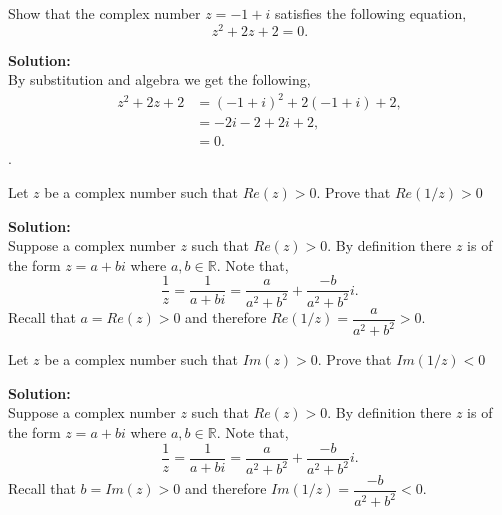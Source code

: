\documentclass[12pt]{article}
\makeatletter
\theoremstyle{homework}
\newenvironment{exercise}[1]
{\def\@currentlabel{#1}\exercisecore}
{\endexercisecore}
\newcommand{\localhead}[1]{\par\smallskip\noindent\textbf{#1}\nobreak\\}%
\newcommand\solution{\localhead{Solution:}}
\newcommand{\Reals}{\ensuremath{\mathbb R}}
\let\RR\Reals
\makeatother
\begin{document}
\begin{exercise}{18} Show that the complex number $z = -1 + i$ satisfies the following equation, 
    \begin{equation*}
        z^2 + 2z + 2 = 0.
    \end{equation*}
    \solution By substitution and algebra we get the following, 
    \begin{align*}
        z^2 + 2z + 2 &= (-1 + i)^2 + 2(-1 + i) + 2,\\
        &= -2i -2 + 2i + 2,\\
        &= 0.
    \end{align*}. 
\end{exercise}
\vspace{1in}



\begin{exercise}{23} Let $z$ be a complex number such that $Re(z) > 0$. Prove that $Re(1/z) > 0$\\
    \solution Suppose a complex number $z$ such that $Re(z) > 0$. By definition there $z$ is of the form 
    $z = a + bi$ where $a,b \in \RR$. Note that, 
    \begin{equation*}
        \dfrac{1}{z} = \dfrac{1}{a + bi} = \dfrac{a}{a^2 + b^2} + \dfrac{-b}{a^2 + b^2}i.
    \end{equation*}
    Recall that $a = Re(z) > 0 $ and therefore $Re(1/z) = \dfrac{a}{a^2 + b^2} > 0$. 
\end{exercise}
\vspace{1in}

\begin{exercise}{24} Let $z$ be a complex number such that $Im(z) > 0$. Prove that $Im(1/z) < 0$\\
    \solution Suppose a complex number $z$ such that $Re(z) > 0$. By definition there $z$ is of the form 
    $z = a + bi$ where $a,b \in \RR$. Note that, 
    \begin{equation*}
        \dfrac{1}{z} = \dfrac{1}{a + bi} = \dfrac{a}{a^2 + b^2} + \dfrac{-b}{a^2 + b^2}i.
    \end{equation*}
    Recall that $b = Im(z) > 0 $ and therefore $Im(1/z) = \dfrac{-b}{a^2 + b^2} < 0$. 
\end{exercise}
\vspace{1in}
\end{document}

